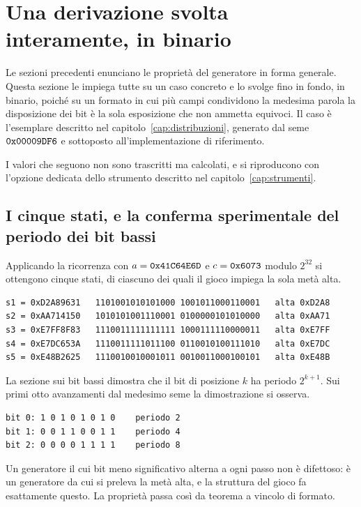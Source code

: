 \section{Una derivazione svolta interamente, in binario}

Le sezioni precedenti enunciano le proprietà del generatore in forma generale. Questa sezione le impiega tutte su un caso concreto e lo svolge fino in fondo, in binario, poiché su un formato in cui più campi condividono la medesima parola la disposizione dei bit è la sola esposizione che non ammetta equivoci. Il caso è l'esemplare descritto nel capitolo~\ref{cap:distribuzioni}, generato dal seme $\texttt{0x00009DF6}$ e sottoposto all'implementazione di riferimento.

I valori che seguono non sono trascritti ma calcolati, e si riproducono con l'opzione dedicata dello strumento descritto nel capitolo~\ref{cap:strumenti}.

\subsection*{I cinque stati, e la conferma sperimentale del periodo dei bit bassi}

Applicando la ricorrenza con $a = \texttt{0x41C64E6D}$ e $c = \texttt{0x6073}$ modulo $2^{32}$ si ottengono cinque stati, di ciascuno dei quali il gioco impiega la sola metà alta.

\begin{verbatim}
s1 = 0xD2A89631   1101001010101000 1001011000110001   alta 0xD2A8
s2 = 0xAA714150   1010101001110001 0100000101010000   alta 0xAA71
s3 = 0xE7FF8F83   1110011111111111 1000111110000011   alta 0xE7FF
s4 = 0xE7DC653A   1110011111011100 0110010100111010   alta 0xE7DC
s5 = 0xE48B2625   1110010010001011 0010011000100101   alta 0xE48B
\end{verbatim}

La sezione sui bit bassi dimostra che il bit di posizione $k$ ha periodo $2^{k+1}$. Sui primi otto avanzamenti dal medesimo seme la dimostrazione si osserva.

\begin{verbatim}
bit 0: 1 0 1 0 1 0 1 0    periodo 2
bit 1: 0 0 1 1 0 0 1 1    periodo 4
bit 2: 0 0 0 0 1 1 1 1    periodo 8
\end{verbatim}

Un generatore il cui bit meno significativo alterna a ogni passo non è difettoso: è un generatore da cui si preleva la metà alta, e la struttura del gioco fa esattamente questo. La proprietà passa così da teorema a vincolo di formato.

